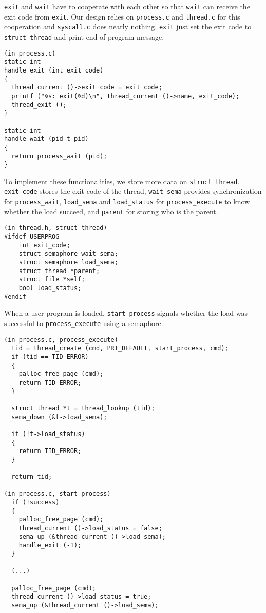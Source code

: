 \documentclass[a4paper,article,11pt,oneside]{article}
\begin{document}
\texttt{exit} and \texttt{wait} have to cooperate with each other so
that \texttt{wait} can receive the exit code from \texttt{exit}. Our
design relies on \texttt{process.c} and \texttt{thread.c} for this
cooperation and \texttt{syscall.c} does nearly nothing. \texttt{exit}
just set the exit code to \texttt{struct thread} and print
end-of-program message.

\begin{verbatim}
(in process.c)
static int
handle_exit (int exit_code)
{
  thread_current ()->exit_code = exit_code;
  printf ("%s: exit(%d)\n", thread_current ()->name, exit_code);
  thread_exit ();
}

static int
handle_wait (pid_t pid)
{
  return process_wait (pid);
}
\end{verbatim}

To implement these functionalities, we store more data on
\texttt{struct thread}. \texttt{exit\_code} stores the exit code of the
thread, \texttt{wait\_sema} provides synchronization for
\texttt{process\_wait}, \texttt{load\_sema} and \texttt{load\_status}
for \texttt{process\_execute} to know whether the load succeed,
and \texttt{parent} for storing who is the parent.
\begin{verbatim}
(in thread.h, struct thread)
#ifdef USERPROG
    int exit_code;
    struct semaphore wait_sema;
    struct semaphore load_sema;
    struct thread *parent;
    struct file *self;
    bool load_status;
#endif
\end{verbatim}

When a user program is loaded, \texttt{start\_process} signals whether
the load was successful to \texttt{process\_execute} using a semaphore.
\begin{verbatim}
(in process.c, process_execute)
  tid = thread_create (cmd, PRI_DEFAULT, start_process, cmd);
  if (tid == TID_ERROR)
  {
    palloc_free_page (cmd);
    return TID_ERROR;
  }

  struct thread *t = thread_lookup (tid);
  sema_down (&t->load_sema);

  if (!t->load_status)
  {
    return TID_ERROR;
  }

  return tid;

(in process.c, start_process)
  if (!success)
  {
    palloc_free_page (cmd);
    thread_current ()->load_status = false;
    sema_up (&thread_current ()->load_sema);
    handle_exit (-1);
  }

  (...)

  palloc_free_page (cmd);
  thread_current ()->load_status = true;
  sema_up (&thread_current ()->load_sema);
\end{verbatim}
\end{document}
